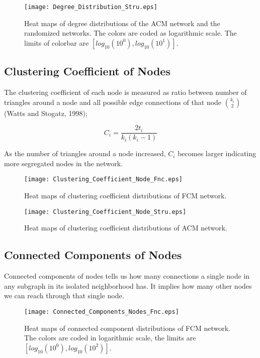 \documentclass[12pt]{article}
\begin{document}
\newpage

\begin{figure}[h!]
	\centering
	\texttt{[image: Degree\_Distribution\_Stru.eps]}
	\caption{Heat maps of degree distributions of the ACM network and the randomized networks. The colors are coded as logarithmic scale. The limits of colorbar are $[log_{10}(10^0), log_{10}(10^1)]$. }
\end{figure}

\newpage

\subsection{Clustering Coefficient of Nodes}

The clustering coefficient of each node is measured as ratio between number of triangles around a node and all possible edge connections of that node ${k_i \choose 2} $ (Watts and Stogatz, 1998); 

\begin{equation}
C_i =  \frac{2t_i}{k_i(k_i -1)}
\end{equation}

As the number of triangles around a node increased, $C_i$ becomes larger indicating more segregated nodes in the network.


\begin{figure}[h!]
	\centering
	\texttt{[image: Clustering\_Coefficient\_Node\_Fnc.eps]}
	\caption{Heat maps of clustering coefficient distributions of FCM network.}
\end{figure}

\newpage

\begin{figure}[h!]
	\centering
	\texttt{[image: Clustering\_Coefficient\_Node\_Stru.eps]}
	\caption{Heat maps of clustering coefficient distributions of ACM network.}
\end{figure}

\newpage

\subsection{Connected Components of Nodes}
Connected components of nodes tells us how many connections a single node in any subgraph in its isolated neighborhood has. It implies how many other nodes we can reach through that single node. 



\begin{figure}[h!]
	\centering
	\texttt{[image: Connected\_Components\_Nodes\_Fnc.eps]}
	\caption{Heat maps of connected component distributions of FCM network. The colors are coded in logarithmic scale, the limits are $[log_{10}(10^0), log_{10}(10^2)]$.}
\end{figure}
\end{document}
